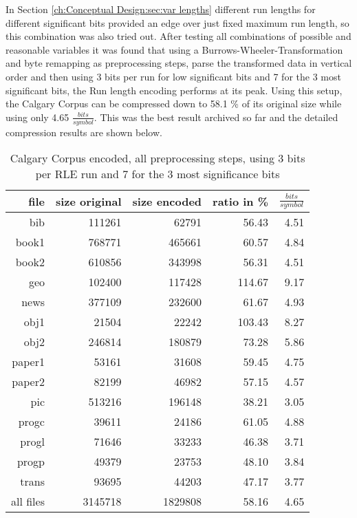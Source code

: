 \par{
In Section \ref{ch:Conceptual Design:sec:var lengths} different run lengths for different significant bits provided an edge over just fixed maximum run length, so this combination was also tried out. After testing all combinations of possible and reasonable variables it was found that using a Burrows-Wheeler-Transformation and byte remapping as preprocessing steps, parse the transformed data in vertical order and then using 3 bits per run for low significant bits and 7 for the 3 most significant bits, the Run length encoding performs at its peak. Using this setup, the Calgary Corpus can be compressed down to 58.1 \% of its original size while using only 4.65 $\frac{bits}{symbol}$. This was the best result archived so far and the detailed compression results are shown below.
\begin{table}[H]
	\centering
	\begin{tabular}{r|r|r|r|r}	
		file & size original & size encoded & ratio in \% & $\frac{bits}{symbol}$\\
		\hline
		bib & 111261 & 62791 & 56.43 & 4.51\\
		book1 & 768771 & 465661 & 60.57 & 4.84 \\
		book2 & 610856 & 343998 & 56.31 & 4.51\\
		geo & 102400 & 117428 & 114.67 & 9.17\\
		news & 377109 & 232600 & 61.67 & 4.93\\
		obj1 & 21504 & 22242 & 103.43 & 8.27\\
		obj2& 246814 & 180879 & 73.28 & 5.86\\		 
		paper1 & 53161 & 31608 & 59.45 & 4.75\\		 
		paper2& 82199 & 46982 & 57.15 & 4.57\\		 
		pic & 513216 & 196148 & 38.21 & 3.05\\		 
		progc & 39611 & 24186 & 61.05 & 4.88\\		 
		progl & 71646 & 33233 & 46.38 & 3.71\\		 
		progp & 49379 & 23753 & 48.10 & 3.84\\		 
		trans & 93695 & 44203 & 47.17 & 3.77\\
		\hline
		all files & 3145718 & 1829808 & 58.16 & 4.65
	\end{tabular}
	\caption{Calgary Corpus encoded, all preprocessing steps, using 3 bits per RLE run and 7 for the 3 most significance bits}
	\label{tab:t5:Calgary Corpus encoded, all preprocessing steps, using 3 bits per RLE run and 7 for the 3 most significance bits}

\end{table}}
